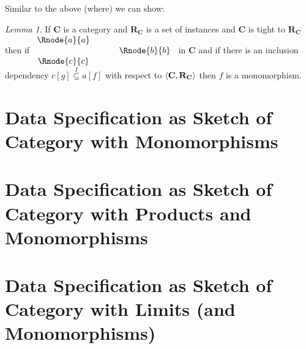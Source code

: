 \documentclass[10pt,a4paper]{article}
\theoremstyle{remark}
\newtheorem*{lemma*}{Lemma}
\newcommand{\catc}[1][C]{\textbf{#1}}
\newcommand{\reqt}{\textbf{R}}
\newcommand{\reqtc}[1][\catc]{\reqt_{#1}}
\begin{document}
Similar to the above (where)  we can show:

\begin{lemma*}
If $\catc$ is a category and $\reqtc$ is a set of instances and $\catc$ is tight to $\reqtc$
then if $
\begin{array}{c p{0.5cm} c  }
\Rnode{a}{a} &&                \\[0.01cm] 
             &&   \Rnode{b}{b} \\[0.01cm]
\Rnode{c}{c}         
\end{array} 
$
in $\catc$ and if there is an inclusion dependency $c[g] \overset{I}{\subseteq} a[f]$ with respect to $\tuple{\catc,\reqtc}$ then $f$ is a monomorphism.
\end{lemma*}

\section*{Data Specification as Sketch of Category with  Monomorphisms}
\section*{Data Specification as Sketch of Category with Products and Monomorphisms}
\section*{Data Specification as Sketch of Category with Limits (and Monomorphisms)}
\end{document}

